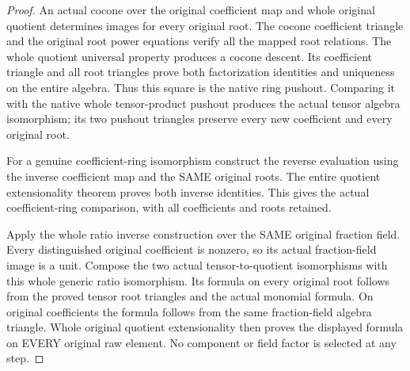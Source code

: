 \begin{proof}
An actual cocone over the original coefficient map and whole original
quotient determines images for every original root. The cocone coefficient
triangle and the original root power equations verify all the mapped root
relations. The whole quotient universal property produces a cocone descent.
Its coefficient triangle and all root triangles prove both factorization
identities and uniqueness on the entire algebra. Thus this square is the
native ring pushout. Comparing it with the native whole tensor-product
pushout produces the actual tensor algebra isomorphism; its two pushout
triangles preserve every new coefficient and every original root.

For a genuine coefficient-ring isomorphism construct the reverse evaluation
using the inverse coefficient map and the SAME original roots. The entire
quotient extensionality theorem proves both inverse identities. This gives
the actual coefficient-ring comparison, with all coefficients and roots
retained.

Apply the whole ratio inverse construction over the SAME original fraction
field. Every distinguished original coefficient is nonzero, so its actual
fraction-field image is a unit. Compose the two actual tensor-to-quotient
isomorphisms with this whole generic ratio isomorphism. Its formula on every
original root follows from the proved tensor root triangles and the actual
monomial formula. On original coefficients the formula follows from the
same fraction-field algebra triangle. Whole original quotient extensionality
then proves the displayed formula on EVERY original raw element. No component
or field factor is selected at any step.
\end{proof}

